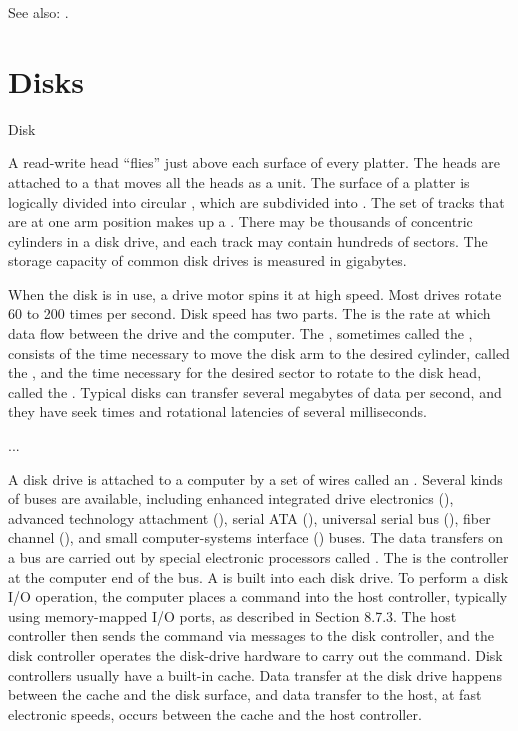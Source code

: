 See also: .

\section{Disks}

\begin{frame}{Disk}
  \begin{center}
     
  \end{center}
\end{frame}

A read-write head “ﬂies” just above each surface of every platter. The heads are attached
to a  that moves all the heads as a unit. The surface of a platter is
logically divided into circular , which are subdivided into
. The set of tracks that are at one arm position makes up a .
There may be thousands of concentric cylinders in a disk drive, and each track may contain
hundreds of sectors. The storage capacity of common disk drives is measured in
gigabytes.

When the disk is in use, a drive motor spins it at high speed. Most drives rotate 60 to
200 times per second. Disk speed has two parts. The  is the rate at
which data ﬂow between the drive and the computer. The , sometimes
called the , consists of the time necessary to move the disk arm to
the desired cylinder, called the , and the time necessary for the desired
sector to rotate to the disk head, called the . Typical disks can
transfer several megabytes of data per second, and they have seek times and rotational
latencies of several milliseconds.

...

A disk drive is attached to a computer by a set of wires called an . Several
kinds of buses are available, including enhanced integrated drive electronics
(), advanced technology attachment (), serial ATA (),
universal serial bus (), ﬁber channel (), and small computer-systems
interface () buses. The data transfers on a bus are carried out by special
electronic processors called . The  is the
controller at the computer end of the bus. A  is built into each
disk drive. To perform a disk I/O operation, the computer places a command into the host
controller, typically using memory-mapped I/O ports, as described in Section 8.7.3. The
host controller then sends the command via messages to the disk controller, and the disk
controller operates the disk-drive hardware to carry out the command. Disk controllers
usually have a built-in cache. Data transfer at the disk drive happens between the cache
and the disk surface, and data transfer to the host, at fast electronic speeds, occurs
between the cache and the host controller.

